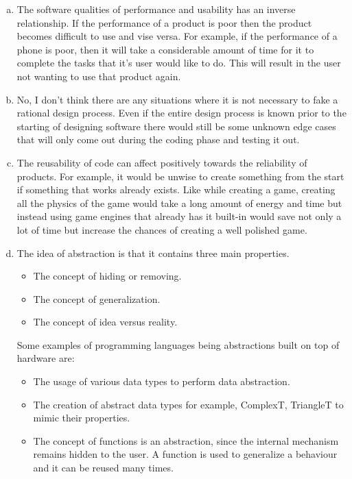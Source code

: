 \documentclass[12pt]{article}
\begin{document}
\begin{enumerate}[(a)]
	\item The software qualities of performance and usability has an inverse relationship. If the performance of a product is poor then the product becomes difficult to use and vise versa. For example, if the performance of a phone is poor, then it will take a considerable amount of time for it to complete the tasks that it's user would like to do. This will result in the user not wanting to use that product again.

	\item No, I don't think there are any situations where it is not necessary to fake a rational design process. Even if the entire design process is known prior to the starting of designing software there would still be some unknown edge cases that will only come out during the coding phase and testing it out. 

	\item The reusability of code can affect positively towards the reliability of products. For example, it would be unwise to create something from the start if something that works already exists. Like while creating a game, creating all the physics of the game would take a long amount of energy and time but instead using game engines that already has it built-in would save not only a lot of time but increase the chances of creating a well polished game.

	\item The idea of abstraction is that it contains three main properties.
	\begin{itemize}
		\item The concept of hiding or removing. 
		\item The concept of generalization.
		\item The concept of idea versus reality.
	\end{itemize} 
	Some examples of programming languages being abstractions built on top of hardware are:
	\begin{itemize}
		\item The usage of various data types to perform data abstraction.
		\item The creation of abstract data types for example, ComplexT, TriangleT to mimic their properties.
		\item The concept of functions is an abstraction, since the internal mechanism remains hidden to the user. A function is used to generalize a behaviour and it can be reused many times.
	\end{itemize}

\end{enumerate}
\end{document}
